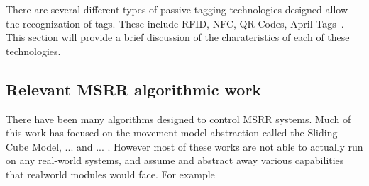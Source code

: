 There are several different types of passive tagging technologies designed allow the recognization of tags. These include RFID, NFC, QR-Codes, April Tags~\cite{wang2016iros}. This section will provide a brief discussion of the charateristics of each of these technologies.


\subsection{Relevant MSRR algorithmic work}
\label{sec:RW-Algorithmic}
There have been many algorithms designed to control MSRR systems. Much of this work has focused on the movement model abstraction called the Sliding Cube Model, ... and ... . However most of these works are not able to actually run on any real-world systems, and assume and abstract away various capabilities that realworld modules would face. For example 